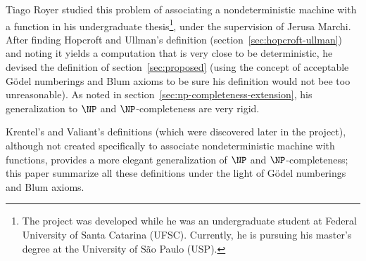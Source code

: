 \documentclass[12pt]{article}
\theoremstyle{definition}
\begin{document}
Tiago Royer studied this problem of associating a nondeterministic machine
with a function in his undergraduate thesis\footnote{
    The project was developed while he was an undergraduate student
    at Federal University of Santa Catarina (UFSC).
    Currently, he is pursuing his master's degree
    at the University of São Paulo (USP).
},
under the supervision of Jerusa Marchi.
After finding Hopcroft and Ullman's definition
(section~\ref{sec:hopcroft-ullman})
and noting it yields a computation that is very close to be deterministic,
he devised the definition of section~\ref{sec:proposed}
(using the concept of acceptable Gödel numberings and Blum axioms
to be sure his definition would not bee too unreasonable).
As noted in section~\ref{sec:np-completeness-extension},
his generalization to $\NP$ and $\NP$-completeness are very rigid.

Krentel's and Valiant's definitions
(which were discovered later in the project),
although not created specifically to associate nondeterministic machine with functions,
provides a more elegant generalization of $\NP$ and $\NP$-completeness;
this paper summarize all these definitions
under the light of Gödel numberings and Blum axioms.



\end{document}
